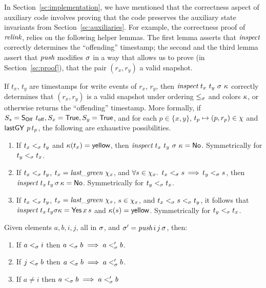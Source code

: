 In Section~\ref{sc:implementation}, we have mentioned that the
correctness aspect of auxiliary code involves proving that the code
preserves the auxiliary state invariants from
Section~\ref{sc:auxiliaries}. For example, the correctness proof of
$\textit{relink}$, relies on the following helper lemmas. The first lemma
asserts that $\textit{inspect}$ correctly determines the ``offending''
timestamp; the second and the third lemma assert that $\textit{push}$
modifies $\sigma$ in a way that allows us to prove (in
Section~\ref{sc:proof}), that the pair $(r_x, r_y)$ a valid snapshot.

\begin{lemma}\label{lem:inspect}
If $t_x$, $t_y$ are timestamps for write events of $r_x$, $r_y$, then
$\aux{inspect}\ t_x\ t_y\ \ordlist\ \C$ correctly determines that
$(r_x, r_y)$ is a valid snapshot under ordering $\mathrel{\leq_\sigma}$ and colors
$\kappa$, or otherwise returns the ``offending'' timestamp. More formally,
if $\sss = \sOff\ \toff, \sx =\TT, \sy =\TT$, and for each $p \in
\{x,y\}$, $ t_p \mapsto (p, r_p) \in \chi$ and $\lgVy\ p\, t_p $, the
following are exhaustive possibilities.

\begin{enumerate}
 \item If $t_x \mathrel{<_\sigma} t_y$ and $ \kappa(t_x) = {\sf yellow}$, then
   $\textit{inspect}\ t_x\ t_y\ \sigma\ \kappa =
   \mathsf{No}$. Symmetrically for $t_y \mathrel{<_\sigma} t_x$.

 \item If $ t_x \mathrel{<_\sigma} t_y $, $ t_x = \textit{last\_green}\ \chi_x$, and
       $\forall s \in \chi_x\mathord{.}\,\ t_x \mathrel{<_\sigma} s\,{\implies}\,t_y \mathrel{<_\sigma}
       s$, then \\ $\textit{inspect}\ t_x\, t_y\, \sigma\, \kappa
       = \mathsf{No}$. Symmetrically for $t_y \mathrel{<_\sigma} t_x$.

 \item If $ t_x <_{\sigma} t_y $, $ t_x = \textit{last\_green}\ \chi_x
   $, $s \in \chi_x$, and $t_x \mathrel{<_\sigma} s \mathrel{<_\sigma} t_y$, it follows that
   $\textit{inspect}\ t_x\, t_y \sigma \kappa = \mathsf{Yes}\, x\, s$ and
   $\kappa(s) = {\sf yellow}$. Symmetrically for $t_y \mathrel{<_\sigma} t_x$.
\end{enumerate}
\end{lemma}

\begin{lemma}\label{lem:push-mono}
Given elements $a, b, i, j$, all in $\sigma$, and $\sigma' =
\textit{push}\, i\, j\, \sigma$, then:
\begin{enumerate}
\item\label{lem:push:left} If $a \mathrel{<_\sigma} i$ then $ a \mathrel{<_\sigma} b \implies a
  \mathrel{<_\sigma'}  b$. 
\item\label{lem:push:right} If $j \mathrel{<_\sigma} b$ then $ a \mathrel{<_\sigma} b \implies a
  \mathrel{<_\sigma'} b $.
\item\label{lem:push:window} If $a \neq i$ then $ a \mathrel{<_\sigma} b \implies a
  \mathrel{<_\sigma'} b $
\end{enumerate}
\end{lemma}

